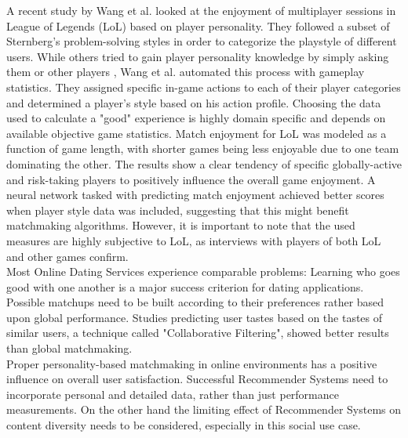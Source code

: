 \documentclass[nochapterpage,bigchapter,linedtoc,longdoc,colorback,accentcolor=tud3b]{tudreport}
\begin{document}
A recent study by Wang et al. \cite{wang2015thinking} looked at the enjoyment of multiplayer sessions in League of Legends (LoL) based on player personality. They followed a subset of Sternberg's \cite{sternberg1999thinking} problem-solving styles in order to categorize the playstyle of different users. While others tried to gain player personality knowledge by simply asking them \cite{riegelsberger2007personality} or other players \cite{patrick2011system}, Wang et al. automated this process with gameplay statistics. They assigned specific in-game actions to each of their player categories and determined a player's style based on his action profile. Choosing the data used to calculate a "good" experience is highly domain specific and depends on available objective game statistics.\cite{delalleau2012beyond} Match enjoyment for LoL was modeled as a function of game length, with shorter games being less enjoyable due to one team dominating the other.  The results show a clear tendency of specific globally-active and risk-taking players to positively influence the overall game enjoyment. A neural network tasked with predicting match enjoyment achieved better scores when player style data was included, suggesting that this might benefit matchmaking algorithms. However, it is important to note that the used measures are highly subjective to LoL, as interviews with players of both LoL and other games confirm.\\
Most Online Dating Services experience comparable problems: Learning who goes good with one another is a major success criterion for dating applications. Possible matchups need to be built according to their preferences rather based upon global performance. Studies predicting user tastes based on the tastes of similar users, a technique called "Collaborative Filtering", showed better results than global matchmaking. \cite{brozovsky2007recommender}\\
Proper personality-based matchmaking in online environments has a positive influence on overall user satisfaction. Successful Recommender Systems need to incorporate personal and detailed data, rather than just performance measurements. On the other hand the limiting effect of Recommender Systems on content diversity needs to be considered, especially in  this social use case. \cite{nguyen2014exploring}\\
\end{document}
